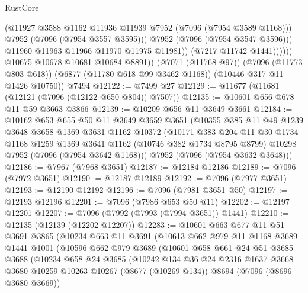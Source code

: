 \begin{lexlean}{RustCore}
\begin{coremodule}
                            (@11927 @3588 @1162 @11936 @11939 @7952 (@7096 (@7954 @3589 @1168)))
                            @7952
                            (@7096 (@7954 @3557 @3595)))
                          @7952
                          (@7096 (@7954 @3547 @3596)))
                        @11960
                        @11963
                        @11966
                        @11970
                        @11975
                        @11981))
                    (@7217 @11742 @1441))))))
          @10675
          @10678
          @10681
          @10684
          @8891))
      (@7071 (@11768 @97))
      (@7096 (@11773 @803 @618))
      (@6877 (@11780 @618 @99 @3462 @1168))
      (@10446 @317 @11 @1426 @10750))
    @7494
@12122 := @7499 @27
@12129 := @11677 (@11681 (@12121 (@7096 (@12122 @650 @804)) @7507))
@12135 := @10601 @656 @678 @11 @59 @3663 @3866
@12139 := @10209 @656 @11 @3649 @3661
@12184 := @10162
    @653
    @655
    @50
    @11
    @3649
    @3659
    @3651
    (@10355
      @385
      @11
      @49
      @1239
      @3648
      @3658
      @1369
      @3631
      @1162
      @10372
      (@10171
        @383
        @204
        @11
        @30
        @1734
        @1168
        @1259
        @1369
        @3641
        @1162
        (@10746 @382 @1734 @8795 @8799)
        @10298
        @7952
        (@7096 (@7954 @3642 @1168)))
      @7952
      (@7096 (@7954 @3632 @3648)))
@12186 := @7967 (@7968 @3651)
@12187 := @12184 @12186
@12189 := @7096 (@7972 @3651)
@12190 := @12187 @12189
@12192 := @7096 (@7977 @3651)
@12193 := @12190 @12192
@12196 := @7096 (@7981 @3651 @50)
@12197 := @12193 @12196
@12201 := @7096 (@7986 @653 @50 @11)
@12202 := @12197 @12201
@12207 := @7096 (@7992 (@7993 (@7994 @3651)) @1441)
@12210 := @12135 (@12139 (@12202 @12207))
@12283 := @10601
    @663
    @677
    @11
    @51
    @3691
    @3865
    (@10234
      @663
      @11
      @3691
      (@10613
        @662
        @979
        @11
        @1168
        @3689
        @1441
        @1001
        (@10596
          @662
          @979
          @3689
          (@10601
            @658
            @661
            @24
            @51
            @3685
            @3688
            (@10234
              @658
              @24
              @3685
              (@10242
                @134
                @36
                @24
                @2316
                @1637
                @3668
                @3680
                @10259
                @10263
                @10267
                (@8677 (@10269 @134))
                @8694
                (@7096 (@8696 @3680 @3669))

\end{coremodule}
\end{lexlean}

